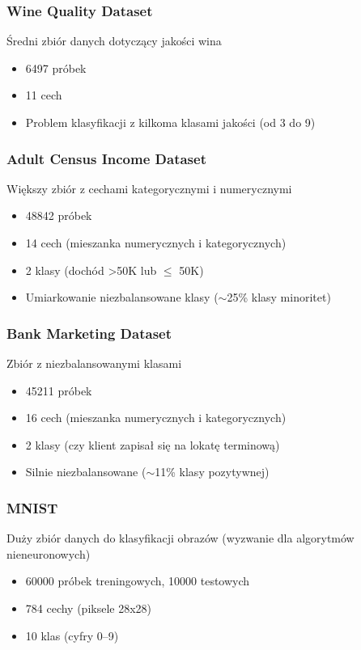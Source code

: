 \documentclass[12pt,a4paper]{article}
\begin{document}
\subsubsection{Wine Quality Dataset}
Średni zbiór danych dotyczący jakości wina
\begin{itemize}
    \item 6497 próbek
    \item 11 cech
    \item Problem klasyfikacji z kilkoma klasami jakości (od 3 do 9)
\end{itemize}

\subsubsection{Adult Census Income Dataset}
Większy zbiór z cechami kategorycznymi i numerycznymi
\begin{itemize}
    \item 48842 próbek
    \item 14 cech (mieszanka numerycznych i kategorycznych)
    \item 2 klasy (dochód >50K lub $\leq$ 50K)
    \item Umiarkowanie niezbalansowane klasy ($\sim$25\% klasy minoritet)
\end{itemize}

\subsubsection{Bank Marketing Dataset}
Zbiór z niezbalansowanymi klasami
\begin{itemize}
    \item 45211 próbek
    \item 16 cech (mieszanka numerycznych i kategorycznych)
    \item 2 klasy (czy klient zapisał się na lokatę terminową)
    \item Silnie niezbalansowane ($\sim$11\% klasy pozytywnej)
\end{itemize}

\subsubsection{MNIST}
Duży zbiór danych do klasyfikacji obrazów (wyzwanie dla algorytmów nieneuronowych)
\begin{itemize}
    \item 60000 próbek treningowych, 10000 testowych
    \item 784 cechy (piksele 28x28)
    \item 10 klas (cyfry 0--9)
\end{itemize}
\end{document}
